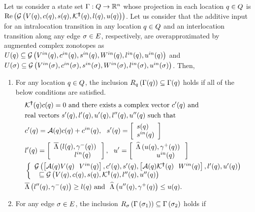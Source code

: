 %
\begin{lemma}
  Let us consider a state set $\Gamma:Q\rightarrow\mathbb{R}^n$ whose projection in each
  location $q\in Q$ is $\operatorname{\operatorname{Re}}\left(\mathcal{G}\left(V(q),c(q),s(q),\mathcal{K}^{\bm{\dagger}}(q),l(q),u(q)\right)\right)$.
  Let us consider that the
  additive input for an intralocation transition in any location 
  $q\in Q$ and an interlocation transition along any edge
  $\sigma\in E$, respectively, are
  overapproximated by augmented complex zonotopes as $U(q)\subseteq
  \mathcal{G}\left(V^{in}(q),c^{in}(q),s^{in}(q),W^{in}(q),l^{in}(q),u^{in}(q)\right)$
  and $U(\sigma)\subseteq
  \mathcal{G}\left(V^{in}(\sigma),c^{in}(\sigma),s^{in}(\sigma),W^{in}(\sigma),l^{in}(\sigma),u^{in}(\sigma)\right)$.  Then,
\begin{enumerate}
\item For any location $q\in Q$, the inclusion
  $R_{q}\left(\Gamma(q)\right)\subseteq
  \Gamma(q)$ holds if 
  all of the below conditions are satisfied.
\begin{align}~\label{eqn:locinv}
\begin{split}
& \mathcal{K}^{\bm{\dagger}}(q)c(q) = 0~\text{and there exists a complex vector}~
  c^\prime(q)~\text{and}\\
& \text{real
    vectors}~s^\prime(q),l^\prime(q),u^\prime(q),l^{\prime\prime}(q),u^{\prime\prime}(q)~\text{such
    that}\\
& c^\prime(q) = \mathcal{A}(q)c(q)+c^{in}(q),~~s^\prime(q) =
  \left[\begin{array}{l}{s(q)}\\{s^{in}(q)} \end{array}\right]\\
& l^\prime(q) =
  \left[\begin{array}{l}{\overline{\Lambda}\left(l(q),\gamma^-(q)\right)}\\{~~~~~~~~~l^{in}(q)~~~} \end{array}\right],~~u^\prime =
  \left[\begin{array}{l}{\widehat{\Lambda}\left(u(q),\gamma^+(q)\right)}\\{~~~~~~~~~u^{in}(q)~~~} \end{array}\right]\\
& \left\{\begin{array}{l}{\mathcal{G}\left(\left[\mathcal{A}(q)V(q)~~V^{in}(q)\right],c^\prime(q),s^\prime(q),\left[\mathcal{A}(q)\mathcal{K}^{\bm{\dagger}}(q)~~W^{in}(q)\right],l^\prime(q),u^\prime(q)\right)}\\{~~\sqsubseteq \mathcal{G}\left(V(q),c(q),s(q),\mathcal{K}^{\bm{\dagger}}(q),l^{\prime\prime}(q),u^{\prime\prime}(q)\right)} \end{array}\right.\\
& \overline{\Lambda}\left(l^{\prime\prime}(q),\gamma^-(q)\right)\geq l(q)~\text{and}~~
\widehat{\Lambda}\left(u^{\prime\prime}(q),\gamma^+(q)\right)\leq u(q).
\end{split}
 \end{align}
\item For any edge $\sigma\in E$, the inclusion
  $R_{\sigma}\left(\Gamma\left(\sigma_{1}\right)\right)
  \subseteq \Gamma\left(\sigma_{2}\right)$ holds if 

\end{enumerate}
\end{lemma}
